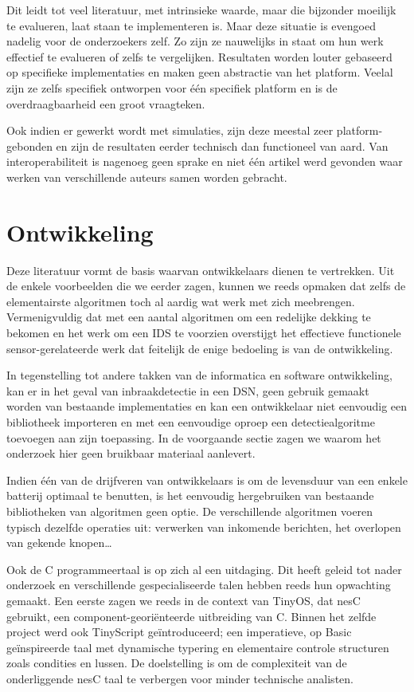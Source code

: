 Dit leidt tot veel literatuur, met intrinsieke waarde, maar die bijzonder
moeilijk te evalueren, laat staan te implementeren is. Maar deze situatie is
evengoed nadelig voor de onderzoekers zelf. Zo zijn ze nauwelijks in staat om
hun werk effectief te evalueren of zelfs te vergelijken. Resultaten worden
louter gebaseerd op specifieke implementaties en maken geen abstractie van het
platform. Veelal zijn ze zelfs specifiek ontworpen voor \'e\'en specifiek
platform en is de overdraagbaarheid een groot vraagteken.

Ook indien er gewerkt wordt met simulaties, zijn deze meestal zeer
platform-gebonden en zijn de resultaten eerder technisch dan functioneel van
aard. Van interoperabiliteit is nagenoeg geen sprake en niet \'e\'en artikel
werd gevonden waar werken van verschillende auteurs samen worden gebracht.

\section{Ontwikkeling}
\label{section:problem-develop}

Deze literatuur vormt de basis waarvan ontwikkelaars dienen te vertrekken. Uit
de enkele voorbeelden die we eerder zagen, kunnen we reeds opmaken dat zelfs de
elementairste algoritmen toch al aardig wat werk met zich meebrengen.
Vermenigvuldig dat met een aantal algoritmen om een redelijke dekking te
bekomen en het werk om een IDS te voorzien overstijgt het effectieve
functionele sensor-gerelateerde werk dat feitelijk de enige bedoeling is van de
ontwikkeling.

In tegenstelling tot andere takken van de informatica en software ontwikkeling,
kan er in het geval van inbraakdetectie in een DSN, geen gebruik gemaakt worden
van bestaande implementaties en kan een ontwikkelaar niet eenvoudig een
bibliotheek importeren en met een eenvoudige oproep een detectiealgoritme
toevoegen aan zijn toepassing. In de voorgaande sectie zagen we waarom het
onderzoek hier geen bruikbaar materiaal aanlevert.

Indien \'e\'en van de drijfveren van ontwikkelaars is om de levensduur van een
enkele batterij optimaal te benutten, is het eenvoudig hergebruiken van
bestaande bibliotheken van algoritmen geen optie. De verschillende algoritmen
voeren typisch dezelfde operaties uit: verwerken van inkomende berichten, het
overlopen van gekende knopen\dots

Ook de C programmeertaal is op zich al een uitdaging. Dit heeft geleid tot
nader onderzoek en verschillende gespecialiseerde talen hebben reeds hun
opwachting gemaakt. Een eerste zagen we reeds in de context van TinyOS, dat
nesC \citep{gay2003nesc} gebruikt, een component-geori\"enteerde uitbreiding
van C. Binnen het zelfde project werd ook TinyScript
\citep{levis2004tinyscript} ge\"introduceerd; een imperatieve, op Basic
ge\"inspireerde taal met dynamische typering en elementaire controle structuren
zoals condities en lussen. De doelstelling is om de complexiteit van de
onderliggende nesC taal te verbergen voor minder technische analisten.

